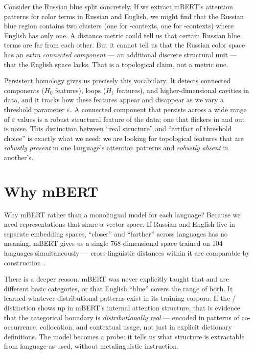 Consider the Russian blue split concretely. If we extract mBERT's attention patterns for color terms in Russian and English, we might find that the Russian blue region contains two clusters (one for -contexts, one for -contexts) where English has only one. A distance metric could tell us that certain Russian blue terms are far from each other. But it cannot tell us that the Russian color space has an \emph{extra connected component} --- an additional discrete structural unit --- that the English space lacks. That is a topological claim, not a metric one.

Persistent homology gives us precisely this vocabulary. It detects connected components ($H_0$ features), loops ($H_1$ features), and higher-dimensional cavities in data, and it tracks how these features appear and disappear as we vary a threshold parameter $\varepsilon$. A connected component that persists across a wide range of $\varepsilon$ values is a robust structural feature of the data; one that flickers in and out is noise. This distinction between ``real structure'' and ``artifact of threshold choice'' is exactly what we need: we are looking for topological features that are \emph{robustly present} in one language's attention patterns and \emph{robustly absent} in another's.

\section{Why mBERT}

Why mBERT rather than a monolingual model for each language? Because we need representations that share a vector space. If Russian and English live in separate embedding spaces, ``closer'' and ``farther'' across languages has no meaning. mBERT gives us a single 768-dimensional space trained on 104 languages simultaneously --- cross-linguistic distances within it are comparable by construction \parencite{pires2019}.

There is a deeper reason. mBERT was never explicitly taught that  and  are different basic categories, or that English ``blue'' covers the range of both. It learned whatever distributional patterns exist in its training corpora. If the / distinction shows up in mBERT's internal attention structure, that is evidence that the categorical boundary is \emph{distributionally real} --- encoded in patterns of co-occurrence, collocation, and contextual usage, not just in explicit dictionary definitions. The model becomes a probe: it tells us what structure is extractable from language-as-used, without metalinguistic instruction.

